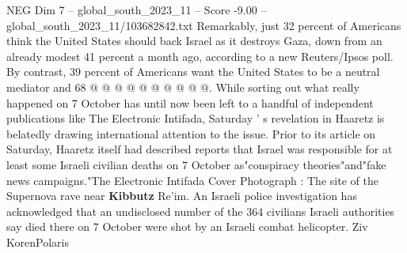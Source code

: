 \begin{textsample}{NEG Dim 7 – global\_south\_2023\_11 – Score -9.00 – global\_south\_2023\_11/103682842.txt}
Remarkably, just 32 percent of Americans think the United States should back Israel as it destroys Gaza, down from an already modest 41 percent a month ago, according to a new Reuters/Ipsos poll.
By contrast, 39 percent of Americans want the United States to be a neutral mediator and 68 @ @ @ @ @ @ @ @ @ @.
While sorting out what really happened on 7 October has until now been left to a handful of independent publications like The Electronic Intifada, Saturday ' s revelation in Haaretz is belatedly drawing international attention to the issue.
Prior to its article on Saturday, Haaretz itself had described reports that Israel was responsible for at least some Israeli civilian deaths on 7 October as"conspiracy theories"and"fake news campaigns."The Electronic Intifada Cover Photograph : The site of the Supernova rave near \textbf{Kibbutz} Re'im.
An Israeli police investigation has acknowledged that an undisclosed number of the 364 civilians Israeli authorities say died there on 7 October were shot by an Israeli combat helicopter.
Ziv KorenPolaris

\end{textsample}
